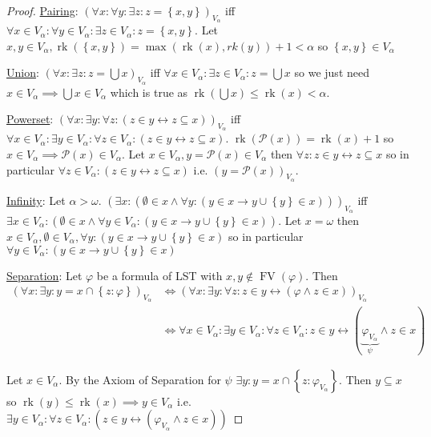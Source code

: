 \documentclass{scrartcl}
\renewcommand{\P}{\mathcal{P}}
\newcommand{\set}[1]{\left\{#1\right\}}
\DeclareMathOperator{\FV}{FV}
\DeclareMathOperator{\rk}{rk}
\theoremstyle{definition}
\theoremstyle{plain}
\theoremstyle{remark}
\begin{document}
	\begin{proof}
		\underline{Pairing}: $(\forall x: \forall y: \exists z: z = \set{x, y})_{V_\alpha}$ iff $\forall x \in V_\alpha: \forall y \in V_\alpha: \exists z \in V_\alpha: z = \set{x, y}$.
		Let $x, y \in V_\alpha, \rk(\set{x, y}) = \max(\rk(x), rk(y))+1 < \alpha$ so $\set{x, y} \in V_\alpha$
		
		\underline{Union}: $(\forall x: \exists z: z= \bigcup x)_{V_\alpha}$ iff $\forall x \in V_\alpha: \exists z \in V_\alpha: z= \bigcup x$ so we just need $x \in V_\alpha \implies \bigcup x \in V_\alpha$ which is true as $\rk(\bigcup x) \leq \rk(x) < \alpha$.
		
		\underline{Powerset}: $(\forall x: \exists y: \forall z: (z \in y \longleftrightarrow z \subseteq x))_{V_\alpha}$ iff $\forall x \in V_\alpha: \exists y\in V_\alpha: \forall z\in V_\alpha: (z \in y \longleftrightarrow z \subseteq x)$. $\rk(\P(x)) = \rk(x) + 1$ so $x \in V_\alpha \implies \P(x) \in V_\alpha$. Let $x \in V_\alpha, y = \P(x) \in V_\alpha$ then $\forall z: z \in y \longleftrightarrow z \subseteq x$ so in particular $\forall z \in V_\alpha: (z \in y\leftrightarrow z \subseteq x)$ i.e. $(y = \P(x))_{V_\alpha}$.
		
		\underline{Infinity}:  Let $\alpha > \omega$. $(\exists x: ( \emptyset \in x \land \forall y : (y \in x \longrightarrow y \cup \set{y} \in x)))_{V_\alpha}$ iff $\exists x \in V_\alpha: ( \emptyset \in x \land \forall y \in V_\alpha : (y \in x \longrightarrow y \cup \set{y} \in x))$. Let $x = \omega$ then $x \in V_\alpha, \emptyset \in V_\alpha, \forall y: (y \in x \longrightarrow y \cup \set{y} \in x)$ so in particular $\forall y \in V_\alpha: (y \in x \longrightarrow y \cup \set{y} \in x)$
		
		\underline{Separation}: Let $\varphi$ be a formula of LST with $x, y \notin \FV(\varphi)$. Then 
		\begin{align*}
			(\forall x: \exists y: y = x \cap \set{z : \varphi})_{V_\alpha} &\iff (\forall x: \exists y: \forall z: z \in y \longleftrightarrow (\varphi \land z \in x))_{V_\alpha}\\
			&\iff \forall x \in V_\alpha: \exists y \in V_\alpha: \forall z \in V_\alpha: z \in y \longleftrightarrow (\underbrace{\varphi_{V_\alpha}}_{\psi} \land z \in x)
		\end{align*} 
		
		Let $x \in V_\alpha$. By the Axiom of Separation for $\psi$ $\exists y: y = x \cap \set{z: \varphi_{V_\alpha}}$. Then $y \subseteq x$ so $\rk(y) \leq \rk(x) \implies y \in V_\alpha$ i.e. $\exists y \in V_\alpha: \forall z \in V_\alpha: (z \in y \longleftrightarrow (\varphi_{V_\alpha} \land z \in x))$
	\end{proof}
\end{document}
